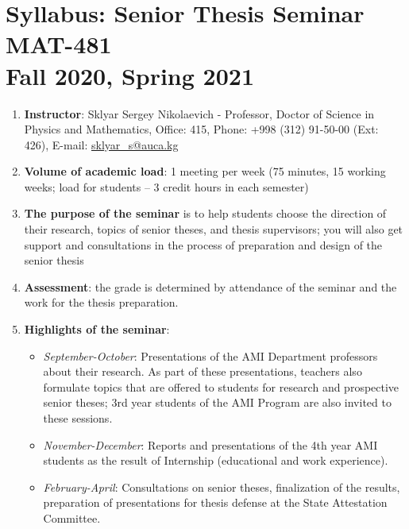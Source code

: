 \documentclass[a4paper, 12pt]{article}
\begin{document}
\section*{Syllabus: Senior Thesis Seminar MAT-481\\Fall 2020, Spring 2021}

\begin{enumerate}
    \item \textbf{Instructor}: Sklyar Sergey Nikolaevich - Professor, Doctor of 
        Science in Physics and Mathematics, Office: 415, Phone: +998 (312) 
        91-50-00 (Ext: 426), E-mail: \url{sklyar_s@auca.kg}
    \item \textbf{Volume of academic load}: 1 meeting per week (75 minutes, 15 
        working weeks; load for students -- 3 credit hours in each semester)
    \item \textbf{The purpose of the seminar} is to help students choose the 
        direction of their research, topics of senior theses, and thesis 
        supervisors; you will also get support and consultations in the process 
        of preparation and design of the senior thesis
    \item \textbf{Assessment}: the grade is determined by attendance of the 
        seminar and the work for the thesis preparation.
    \item \textbf{Highlights of the seminar}:
        \begin{itemize}
            \item \textit{September-October}: Presentations of the AMI 
                Department professors about their research. As part of these 
                presentations, teachers also formulate topics that are offered 
                to students for research and prospective senior theses; 3rd 
                year students of the AMI Program are also invited to these 
                sessions.
            \item \textit{November-December}: Reports and presentations of the 
                4th year AMI students as the result of Internship (educational 
                and work experience).
            \item \textit{February-April}: Consultations on senior theses, 
                finalization of the results, preparation of presentations for 
                thesis defense at the State Attestation Committee.
        \end{itemize}
\end{enumerate}

\newpage
\end{document}
